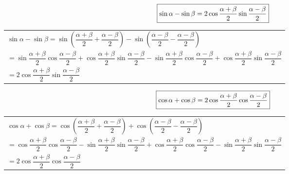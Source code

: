 \vspace*{1.2em}

\begin{equation}
	\boxed{\sin \alpha - \sin \beta = 2 \cos \dfrac{\alpha + \beta}{2}\sin \dfrac{\alpha- \beta}{2}}
	\vspace*{0.5em}
\end{equation}
\begin{tabular}{l}
	\proof \quad $\displaystyle \sin \alpha - \sin \beta = \sin \left( \dfrac{\alpha + \beta }{2} + \dfrac{\alpha - \beta}{2}\right) - \sin \left( \dfrac{\alpha - \beta}{2} - \dfrac{\alpha - \beta}{2} \right)$ \\[-1em]
	$=\sin \dfrac{\alpha + \beta}{2} \cos \dfrac{\alpha - \beta}{2} + \cos \dfrac{\alpha + \beta}{2}\sin \dfrac{\alpha - \beta}{2} - \sin \dfrac{\alpha + \beta}{2}\cos\dfrac{\alpha - \beta}{2} + \cos \dfrac{\alpha + \beta}{2} \sin \dfrac{\alpha - \beta}{2}$\\
	$= 2 \cos \dfrac{\alpha + \beta}{2} \sin \dfrac{\alpha - \beta}{2}$
\end{tabular}

\vspace*{1.2em}

\begin{equation}
	\boxed{\cos \alpha + \cos \beta = 2 \cos \dfrac{\alpha + \beta}{2}\cos \dfrac{\alpha- \beta}{2}}
	\vspace*{0.5em}
\end{equation}
\begin{tabular}{l}
	\proof \quad $\displaystyle \cos \alpha + \cos \beta = \cos \left( \dfrac{\alpha + \beta }{2} + \dfrac{\alpha - \beta}{2}\right) + \cos \left( \dfrac{\alpha - \beta}{2} - \dfrac{\alpha - \beta}{2} \right)$ \\[-1em]
	$=\cos \dfrac{\alpha + \beta}{2} \cos \dfrac{\alpha - \beta}{2} - \sin \dfrac{\alpha + \beta}{2}\sin \dfrac{\alpha - \beta}{2} + \cos \dfrac{\alpha + \beta}{2} \cos\dfrac{\alpha - \beta}{2} - \sin \dfrac{\alpha + \beta}{2} \sin \dfrac{\alpha - \beta}{2}$\\
	$= 2 \cos \dfrac{\alpha + \beta}{2} \cos \dfrac{\alpha - \beta}{2}$
\end{tabular}

\vspace*{2em}

